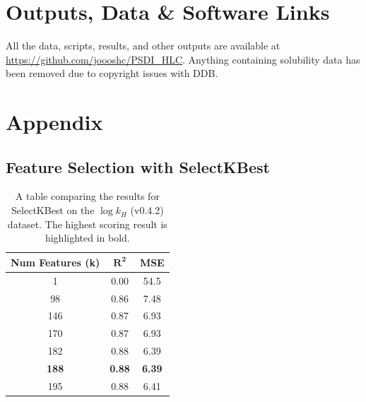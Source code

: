\documentclass[11pt, titlepage]{article}
\begin{document}
\section{Outputs, Data \& Software Links}
\label{sec:outputs}

All the data, scripts, results, and other outputs are available at \url{https://github.com/joooshc/PSDI_HLC}. Anything containing solubility data has been removed due to copyright issues with DDB.


\nocite{python, matplotlib, numpy, scikit}



\section{Appendix}
\label{sec:Appendix}
\subsection{Feature Selection with SelectKBest}

\begin{table}[H]
	\centering\small
	\begin{tabular}{|c|c|c|}
		\hline
		\textbf{Num Features (k)} & $\mathbf{R^2}$ & \textbf{MSE}\\
		\hline
		1 & 0.00 & 54.5 \\
		98 & 0.86 & 7.48 \\
		146 & 0.87 & 6.93 \\
		170 & 0.87 & 6.93 \\
		182 & 0.88 & 6.39 \\
		\textbf{188} & \textbf{0.88} & \textbf{6.39} \\
		195 & 0.88 & 6.41 \\ 
		\hline
	\end{tabular}
	\caption{A table comparing the results for SelectKBest on the $\log k_H$ (v0.4.2) dataset. The highest scoring result is highlighted in bold.}
	\label{tab:SelectKBest}
\end{table}
\end{document}
